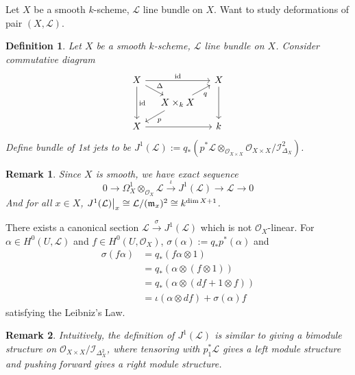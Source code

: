 \documentclass{ctexart}
\newtheorem{definition}{Definition}[section]
\newtheorem{remark}{Remark}[section]
\newcommand{\identity}{\operatorname{id}}
\begin{document}
Let $X$ be a smooth $k$-scheme, $\mathcal{L}$ line bundle on $X$.
Want to study deformations of pair $(X, \mathcal{L})$.
\begin{definition}
    Let $X$ be a smooth $k$-scheme, $\mathcal{L}$ line bundle on $X$.
    Consider commutative diagram
    \begin{equation}
        \begin{tikzcd}[sep = small]
            X \arrow[rr, "\identity"] \arrow[dr, "\Delta"] \arrow[dd, "\identity"] &&
            X \arrow[dd] \\
            & X \times_{k} X \arrow[ur, "q"  swap] \arrow[dl, "p"] & \\
            X \arrow[rr] &&
            k
        \end{tikzcd}
    \end{equation}
    Define bundle of 1st jets to be $J^{1}(\mathcal{L}) := q_{\ast}(p^{\ast}\mathcal{L} \otimes_{\mathcal{O}_{X \times X}} \mathcal{O}_{X \times X}/\mathcal{I}_{\Delta_{X}}^{2})$.
\end{definition}
\begin{remark}
    Since $X$ is smooth, we have exact sequence
    \begin{equation}
        0 \longrightarrow \Omega_{X}^{1} \otimes_{\mathcal{O}_{X}} \mathcal{L} \overset{\iota}{\longrightarrow} J^{1}(\mathcal{L}) \longrightarrow \mathcal{L} \longrightarrow 0
        \label{equation:exact_sequence_of_bundle_of_1st_jets}
    \end{equation}
    And for all $x\in X$, $J^{1}(\mathcal{L})\big{|}_{x} \cong \mathcal{L}/(\mathfrak{m}_{x})^{2} \cong k^{\dim X + 1}$.
\end{remark}
There exists a canonical section $\mathcal{L} \overset{\sigma}{\rightarrow} J^{1}(\mathcal{L})$ which is not $\mathcal{O}_{X}$-linear.
For $\alpha\in H^{0}(U, \mathcal{L})$ and $f\in H^{0}(U, \mathcal{O}_{X})$, $\sigma(\alpha) := q_{\ast}p^{\ast}(\alpha)$ and
\begin{equation}
    \begin{split}
        \sigma(f\alpha) & = q_{\ast}(f\alpha \otimes 1) \\
        & = q_{\ast}(\alpha \otimes (f \otimes 1)) \\
        & = q_{\ast}(\alpha \otimes (df + 1 \otimes f)) \\
        & = \iota(\alpha \otimes df) + \sigma(\alpha)f
    \end{split}
\end{equation}
satisfying the Leibniz's Law.
\begin{remark}
    Intuitively, the definition of $J^{1}(\mathcal{L})$ is similar to giving a bimodule structure on $\mathcal{O}_{X \times X}/\mathcal{I}_{\Delta_{X}^{2}}$,
    where tensoring with $p_{1}^{\ast}\mathcal{L}$ gives a left module structure and pushing forward gives a right module structure.
\end{remark}
\end{document}
